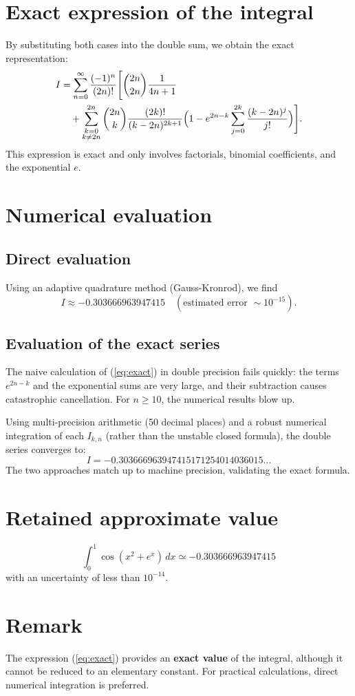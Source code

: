 \documentclass[a4paper,12pt]{article}
\begin{document}
\section{Exact expression of the integral}
By substituting both cases into the double sum, we obtain the exact representation:
\begin{align}
I &= \sum_{n=0}^{\infty} \frac{(-1)^n}{(2n)!}
\Bigg[ \binom{2n}{2n}\frac{1}{4n+1} \nonumber \\
&\quad + \sum_{\substack{k=0\\k\neq 2n}}^{2n} \binom{2n}{k}
\frac{(2k)!}{(k-2n)^{2k+1}}
\Bigl(1 - e^{2n-k}\sum_{j=0}^{2k}\frac{(k-2n)^j}{j!}\Bigr) \Bigg]. \label{eq:exact}
\end{align}
This expression is exact and only involves factorials, binomial coefficients, and the exponential $e$.

\section{Numerical evaluation}
\subsection{Direct evaluation}
Using an adaptive quadrature method (Gauss-Kronrod), we find
\[
I \approx -0.303666963947415 \quad (\text{estimated error } \sim 10^{-15}).
\]

\subsection{Evaluation of the exact series}
The naive calculation of (\ref{eq:exact}) in double precision fails quickly: the terms $e^{2n-k}$ and the exponential sums are very large, and their subtraction causes catastrophic cancellation. For $n\ge 10$, the numerical results blow up.

Using multi-precision arithmetic (50 decimal places) and a robust numerical integration of each $I_{k,n}$ (rather than the unstable closed formula), the double series converges to:
\[
I = -0.303666963947415171254014036015\ldots
\]
The two approaches match up to machine precision, validating the exact formula.

\section{Retained approximate value}
\[
\boxed{\int_0^1 \cos(x^2+e^x)\,dx \simeq -0.303666963947415}
\]
with an uncertainty of less than $10^{-14}$.

\section*{Remark}
The expression (\ref{eq:exact}) provides an \textbf{exact value} of the integral, although it cannot be reduced to an elementary constant. For practical calculations, direct numerical integration is preferred.
\end{document}
